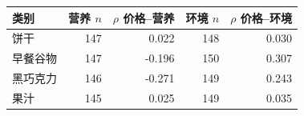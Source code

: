 \begin{tabular}{lrrrr}
\toprule
类别 & 营养 $n$ & $\rho$ 价格--营养 & 环境 $n$ & $\rho$ 价格--环境 \\
\midrule
饼干 & 147 & 0.022 & 148 & 0.030 \\
早餐谷物 & 147 & -0.196 & 150 & 0.307 \\
黑巧克力 & 146 & -0.271 & 149 & 0.243 \\
果汁 & 145 & 0.025 & 149 & 0.035 \\
\bottomrule
\end{tabular}

